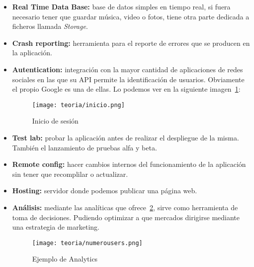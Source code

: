 \begin{itemize}
	\item \textbf{Real Time Data Base:} base de datos simples en tiempo real, si fuera necesario tener que guardar música, video o fotos, tiene otra parte dedicada a ficheros llamada \emph{Storage}.
	\item \textbf{Crash reporting:} herramienta para el reporte de errores que se producen en la aplicación.
	\item \textbf{Autentication:} integración con la mayor cantidad de aplicaciones de redes sociales en las que su API permite la identificación de usuarios. Obviamente el propio Google es una de ellas. Lo podemos ver en la siguiente imagen~\ref{fig:inicio}:
	\begin{figure}[H]
		\centering
		\texttt{[image: teoria/inicio.png]}
		\caption{Inicio de sesión}\label{fig:inicio}
	\end{figure}
	\item \textbf{Test lab:} probar la aplicación antes de realizar el despliegue de la misma. También el lanzamiento de pruebas alfa y beta.
	\item \textbf{Remote config:} hacer cambios internos del funcionamiento de la aplicación sin tener que recomplilar o actualizar.
	\item \textbf{Hosting:} servidor donde podemos publicar una página web.
	\item \textbf{Análisis:} mediante las analíticas que ofrece~\ref{fig:numerousers}, sirve como herramienta de toma de decisiones. Pudiendo optimizar a que mercados dirigirse mediante una estrategia de marketing.
	\begin{figure}[H]
		\centering
		\texttt{[image: teoria/numerousers.png]}
		\caption{Ejemplo de Analytics}\label{fig:numerousers}
	\end{figure}
\end{itemize}
